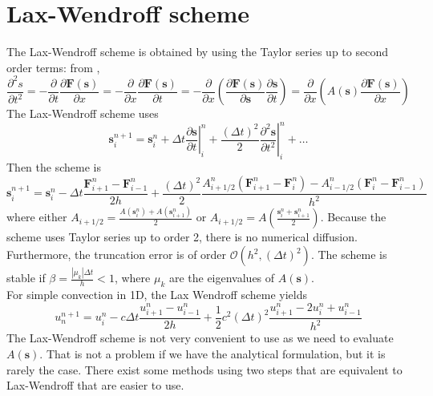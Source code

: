 \documentclass[12pt, openany]{report}
\theoremstyle{definition}
\begin{document}
\section{Lax-Wendroff scheme}
The Lax-Wendroff scheme is obtained by using the Taylor series up to second order terms: from , 
\begin{equation}
	\frac{\partial^2 s}{\partial t^2} = -\frac{\partial }{\partial t}\frac{\partial \boldsymbol{F}(\boldsymbol{s})}{\partial x} = -\frac{\partial }{\partial x}\frac{\partial \boldsymbol{F}(\boldsymbol{s})}{\partial t}=-\frac{\partial }{\partial x} \left(\frac{\partial \boldsymbol{F}(\boldsymbol{s})}{\partial \boldsymbol{s}}\frac{\partial \boldsymbol{s}}{\partial t}\right) = \frac{\partial}{\partial x}\left(A(\boldsymbol{s})\frac{\partial \boldsymbol{F}(\boldsymbol{s})}{\partial x}\right)
\end{equation}
The Lax-Wendroff scheme uses 
\begin{equation}
	\boldsymbol{s}_i^{n+1} = \boldsymbol{s}_i^n + \Delta t\left.\frac{\partial \boldsymbol{s}}{\partial t}\right|_i^n + \frac{(\Delta t)^2}{2} \left.\frac{\partial^2 \boldsymbol{s}}{\partial t^2}\right|_i^n + \dots 
\end{equation}
Then the scheme is 
\begin{equation}
	\boldsymbol{s}_i^{n+1} = \boldsymbol{s}_i^n - \Delta t \frac{\boldsymbol{F}_{i+1}^n-\boldsymbol{F}_{i-1}^n }{2h} + \frac{(\Delta t)^2}{2}\frac{A_{i+1/2}^n \left(\boldsymbol{F}_{i+1}^n-\boldsymbol{F}_i^n\right) - A_{i-1/2}^n\left(\boldsymbol{F}_i^n - \boldsymbol{F}_{i-1}^n\right)}{h^2}
\end{equation}
where either $A_{i+1/2} = \frac{A(\boldsymbol{s}_i^n) + A(\boldsymbol{s}_{i+1}^n)}{2}$ or $A_{i+1/2} = A\left(\frac{\boldsymbol{s}_i^n + \boldsymbol{s}_{i+1}^n}{2}\right)$. Because the scheme uses Taylor series up to order 2, there is no numerical diffusion. Furthermore, the truncation error is of order $\mathcal{O}(h^2, (\Delta t)^2)$. The scheme is stable if $\beta=\frac{|\mu_k|\Delta t}{h}<1$, where $\mu_k$ are the eigenvalues of $A(\boldsymbol{s})$. \\

For simple convection in 1D, the Lax Wendroff scheme yields 
\begin{equation}
	u^{n+1}_n = u_i^n - c\Delta t \frac{u_{i+1}^n - u_{i-1}^n}{2h} +\frac{1}{2}c^2 (\Delta t)^2 \frac{u_{i+1}^n - 2u_i^n+u_{i-1}^n}{h^2}
\end{equation}
The Lax-Wendroff scheme is not very convenient to use as we need to evaluate $A(\boldsymbol{s})$. That is not a problem if we have the analytical formulation, but it is rarely the case. There exist some methods using two steps that are equivalent to Lax-Wendroff that are easier to use. 
\end{document}
